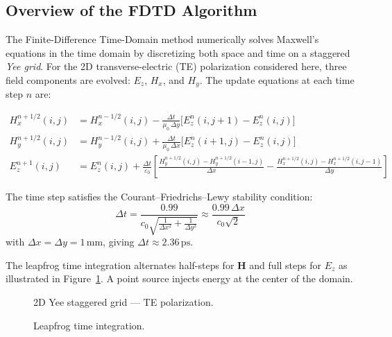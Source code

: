 \documentclass[12pt,a4paper]{article}
\begin{document}
\subsection{Overview of the FDTD Algorithm}

The Finite-Difference Time-Domain method numerically solves Maxwell's equations in the time domain by discretizing both space and time
on a staggered \emph{Yee grid}.
For the 2D transverse-electric (TE) polarization considered here,
three field components are evolved:
$E_z$, $H_x$, and $H_y$.
The update equations at each time step $n$ are:

\begin{align}
H_x^{n+1/2}(i,j) &= H_x^{n-1/2}(i,j)
    - \frac{\Delta t}{\mu_0\,\Delta y}
      \bigl[E_z^n(i,j+1) - E_z^n(i,j)\bigr]
\label{eq:hx}\\[4pt]
H_y^{n+1/2}(i,j) &= H_y^{n-1/2}(i,j)
    + \frac{\Delta t}{\mu_0\,\Delta x}
      \bigl[E_z^n(i+1,j) - E_z^n(i,j)\bigr]
\label{eq:hy}\\[4pt]
E_z^{n+1}(i,j)   &= E_z^n(i,j)
    + \frac{\Delta t}{\varepsilon_0}
      \left[
        \frac{H_y^{n+1/2}(i,j)-H_y^{n+1/2}(i-1,j)}{\Delta x}
        - \frac{H_x^{n+1/2}(i,j)-H_x^{n+1/2}(i,j-1)}{\Delta y}
      \right]
\label{eq:ez}
\end{align}

The time step satisfies the Courant–Friedrichs–Lewy stability condition:
\begin{equation}
    \Delta t = \frac{0.99}{\displaystyle c_0\sqrt{\frac{1}{\Delta x^2}+\frac{1}{\Delta y^2}}}
    \approx \frac{0.99\,\Delta x}{c_0\sqrt{2}}
\end{equation}
with $\Delta x = \Delta y = 1\,\text{mm}$, giving
$\Delta t \approx 2.36\,\text{ps}$.

The leapfrog time integration alternates half-steps for $\mathbf{H}$
and full steps for $E_z$ as illustrated in Figure~\ref{fig:yee}.
A point source injects energy at the center of the domain.

\begin{figure}[H]
  \centering
  \resizebox{\textwidth}{!}{}
  \caption{2D Yee staggered grid — TE polarization.}
  \label{fig:yee}
\end{figure}

\begin{figure}[H]
  \centering
  \resizebox{0.95\textwidth}{!}{}
  \caption{Leapfrog time integration.}
  \label{fig:leapfrog}
\end{figure}
\end{document}
